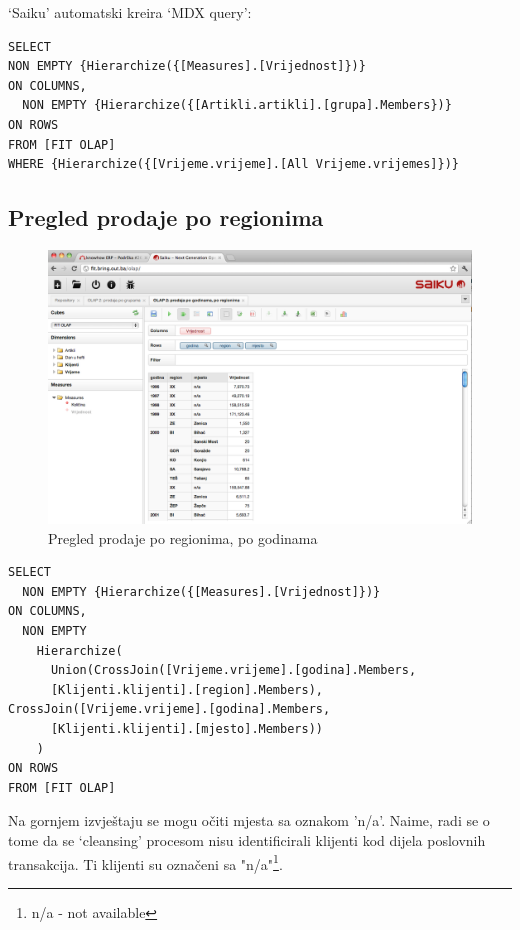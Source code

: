 \documentclass[times, utf8, seminar]{fit}
\begin{document}
`Saiku' automatski kreira `MDX query':

\begin{lstlisting}
SELECT
NON EMPTY {Hierarchize({[Measures].[Vrijednost]})} 
ON COLUMNS,
  NON EMPTY {Hierarchize({[Artikli.artikli].[grupa].Members})} 
ON ROWS
FROM [FIT OLAP]
WHERE {Hierarchize({[Vrijeme.vrijeme].[All Vrijeme.vrijemes]})}
\end{lstlisting}

\subsection{Pregled prodaje po regionima}

\begin{figure}[H]
\centering
\includegraphics[width=15cm]{img/saiku_rpt_region}
\caption{Pregled prodaje po regionima, po godinama}
\end{figure}

\begin{lstlisting}
SELECT
  NON EMPTY {Hierarchize({[Measures].[Vrijednost]})} 
ON COLUMNS,
  NON EMPTY 
    Hierarchize(
      Union(CrossJoin([Vrijeme.vrijeme].[godina].Members, 
      [Klijenti.klijenti].[region].Members), CrossJoin([Vrijeme.vrijeme].[godina].Members, 
      [Klijenti.klijenti].[mjesto].Members))
    ) 
ON ROWS
FROM [FIT OLAP]
\end{lstlisting}

Na gornjem izvještaju se mogu očiti mjesta sa oznakom 'n/a'. Naime, radi se o tome da se `cleansing' procesom nisu identificirali klijenti kod dijela poslovnih transakcija. Ti klijenti su označeni sa "n/a"\footnote{n/a - not available}.
\end{document}
